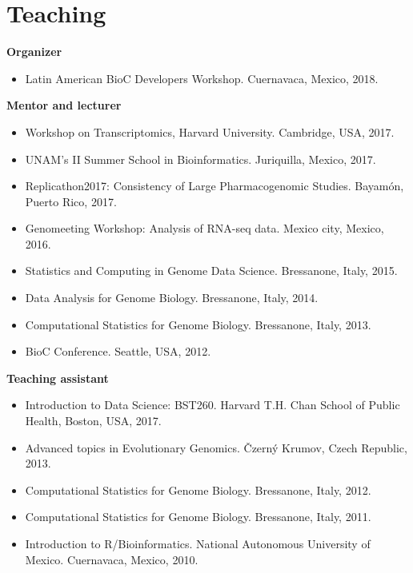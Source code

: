 \documentclass[11pt,a4paper,sans]{moderncv} %
\begin{document}
\vspace{-.2cm}
\section{Teaching}
\vspace{-.1cm}
\textbf{Organizer}
\begin{itemize}
\item Latin American BioC Developers Workshop. Cuernavaca, Mexico, 2018.
\end{itemize}
\vspace{.1cm}
\textbf{Mentor and lecturer}
\begin{itemize}
\item Workshop on Transcriptomics, Harvard University. Cambridge, USA, 2017. 
\item UNAM's II Summer School in Bioinformatics. Juriquilla, Mexico, 2017. 
\item Replicathon2017: Consistency of Large Pharmacogenomic Studies. Bayam\'on, Puerto Rico, 2017.
\item Genomeeting Workshop: Analysis of RNA-seq data. Mexico city, Mexico, 2016.
\item Statistics and Computing in Genome Data Science. Bressanone, Italy, 2015.
\item Data Analysis for Genome Biology. Bressanone, Italy, 2014.
\item Computational Statistics for Genome Biology. Bressanone, Italy, 2013.
\item BioC Conference. Seattle, USA, 2012.
\end{itemize}
\vspace{.1cm}
\textbf{Teaching assistant}
\begin{itemize}
\item Introduction to Data Science: BST260. Harvard T.H. Chan School of Public Health, Boston, USA, 2017. 
\item Advanced topics in Evolutionary Genomics. {\v C}zern\'y  Krumov, Czech Republic, 2013.
\item Computational Statistics for Genome Biology. Bressanone, Italy, 2012. 
\item Computational Statistics for Genome Biology. Bressanone, Italy, 2011. 
\item Introduction to R/Bioinformatics. National Autonomous University of Mexico. Cuernavaca, Mexico, 2010.
\end{itemize}

\end{document}
